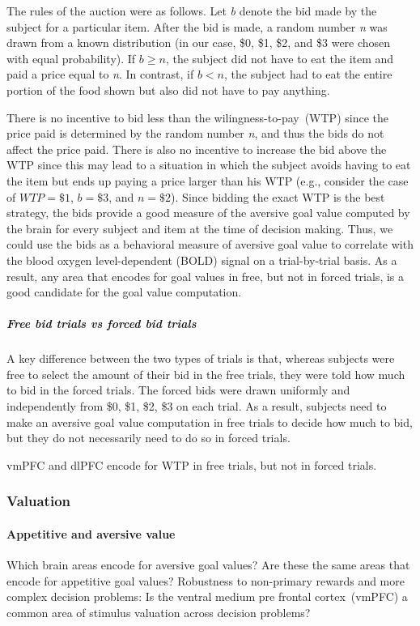 \documentclass[12pt,article,oneside,a4paper]{memoir}
\begin{document}
The rules of the auction were as follows. Let \textit{b} denote the bid made by
the subject for a particular item. After the bid is made, a random number
\textit{n} was drawn from a known distribution (in our case, \$0, \$1, \$2, and
\$3 were chosen with equal probability). If $b \geq n$, the subject did not
have to eat the item and paid a price equal to \textit{n}. In contrast, if $b <
n$, the subject had to eat the entire portion of the food shown but also did
not have to pay anything.

There is no incentive to bid less than the wilingness-to-pay~(WTP) since the
price paid is determined by the random number \textit{n}, and thus the bids do
not affect the price paid.
There is also no incentive to increase the bid above the WTP since this may
lead to a situation in which the subject avoids having to eat the item but ends
up paying a price larger than his WTP (e.g., consider the case of $WTP = \$1$,
$b = \$3$, and $n = \$2$). Since bidding the exact WTP is the best strategy,
the bids provide a good measure of the aversive goal value computed by the
brain for every subject and item at the time of decision making. Thus, we could
use the bids as a behavioral measure of aversive goal value to correlate with
the blood oxygen level-dependent (BOLD) signal on a trial-by-trial basis. As a
result, any area that encodes for goal values in free, but not in forced
trials, is a good candidate for the goal value computation.

\subparagraph{Free bid trials vs forced bid trials}
A key difference between the two types of trials is that, whereas subjects were
free to select the amount of their bid in the free trials, they were told how
much to bid in the forced trials. The forced bids were drawn uniformly and
independently from \$0, \$1, \$2, \$3 on each trial. As a result, subjects need
to make an aversive goal value computation in free trials to decide how much to
bid, but they do not necessarily need to do so in forced trials.

vmPFC and dlPFC encode for WTP in free trials, but not in forced trials.

\subsubsection{Valuation}
\paragraph{Appetitive and aversive value}
Which brain areas encode for aversive goal values?
Are these the same areas that encode for appetitive goal values?
Robustness to non-primary rewards and more complex decision problems: Is the
ventral medium pre frontal cortex~(vmPFC) a common area of stimulus valuation
across decision problems?
\end{document}

